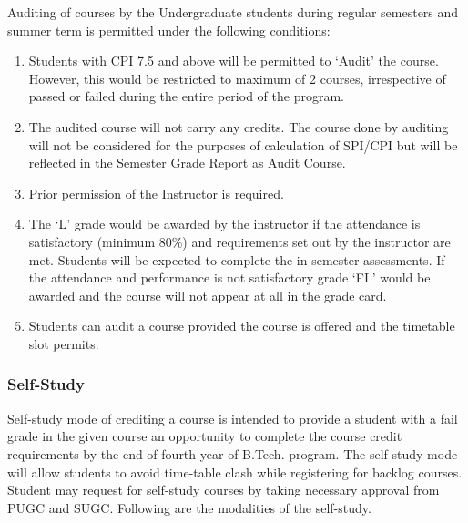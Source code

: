 Auditing of courses by the Undergraduate students during regular semesters and summer term is permitted under the following conditions: 

\begin{enumerate}
    \item Students with CPI 7.5 and above will be permitted to ‘Audit' the course. However, this would be restricted to maximum of 2 courses, irrespective of passed or failed during the entire period of the program. 
    \item The audited course will not carry any credits. The course done by auditing will not be considered for the purposes of calculation of SPI/CPI but will be reflected in the Semester Grade Report as Audit Course. 
    \item Prior permission of the Instructor is required. 
    \item The ‘L' grade would be awarded by the instructor if the attendance is satisfactory (minimum 80\%) and requirements set out by the instructor are met. Students will be expected to complete the in-semester assessments. If the attendance and performance is not satisfactory grade ‘FL’ would be awarded and the course will not appear at all in the grade card. 
    \item Students can audit a course provided the course is offered and the timetable slot permits. 
\end{enumerate}

\subsubsection{Self-Study}

Self-study mode of crediting a course is intended to provide a student with a fail grade in the given course an opportunity to complete the course credit requirements by the end of fourth year of B.Tech. program. The self-study mode will allow students to avoid time-table clash while registering for backlog courses. Student may request for self-study courses by taking necessary approval from PUGC and SUGC. Following are the modalities of the self-study.

